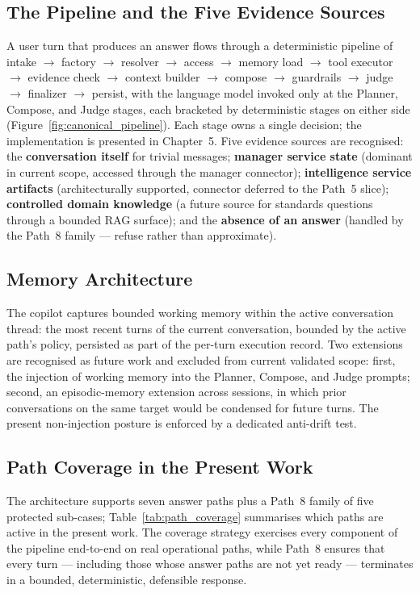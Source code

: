 \subsection{The Pipeline and the Five Evidence Sources}
A user turn that produces an answer flows through a deterministic pipeline of intake $\rightarrow$ factory $\rightarrow$ resolver $\rightarrow$ access $\rightarrow$ memory load $\rightarrow$ tool executor $\rightarrow$ evidence check $\rightarrow$ context builder $\rightarrow$ compose $\rightarrow$ guardrails $\rightarrow$ judge $\rightarrow$ finalizer $\rightarrow$ persist, with the language model invoked only at the Planner, Compose, and Judge stages, each bracketed by deterministic stages on either side (Figure~\ref{fig:canonical_pipeline}). Each stage owns a single decision; the implementation is presented in Chapter~5. Five evidence sources are recognised: the \textbf{conversation itself} for trivial messages; \textbf{manager service state} (dominant in current scope, accessed through the manager connector); \textbf{intelligence service artifacts} (architecturally supported, connector deferred to the Path~5 slice); \textbf{controlled domain knowledge} (a future source for standards questions through a bounded RAG surface); and the \textbf{absence of an answer} (handled by the Path~8 family --- refuse rather than approximate).

\subsection{Memory Architecture}
The copilot captures bounded working memory within the active conversation thread: the most recent turns of the current conversation, bounded by the active path's policy, persisted as part of the per-turn execution record. Two extensions are recognised as future work and excluded from current validated scope: first, the injection of working memory into the Planner, Compose, and Judge prompts; second, an episodic-memory extension across sessions, in which prior conversations on the same target would be condensed for future turns. The present non-injection posture is enforced by a dedicated anti-drift test.

\subsection{Path Coverage in the Present Work}
The architecture supports seven answer paths plus a Path~8 family of five protected sub-cases; Table~\ref{tab:path_coverage} summarises which paths are active in the present work. The coverage strategy exercises every component of the pipeline end-to-end on real operational paths, while Path~8 ensures that every turn --- including those whose answer paths are not yet ready --- terminates in a bounded, deterministic, defensible response.

